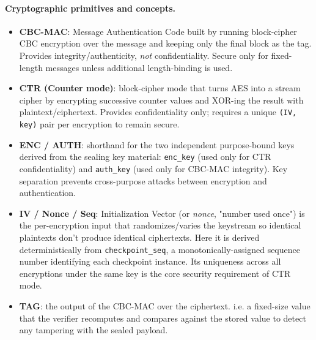 \documentclass[11pt,a4paper]{report}
\begin{document}
\paragraph{Cryptographic primitives and concepts.}
\begin{itemize}
    \item \textbf{CBC-MAC}: Message Authentication Code built by
    running block-cipher CBC encryption over the message and keeping
    only the final block as the tag. Provides integrity/authenticity,
    \textit{not} confidentiality. Secure only for fixed-length messages
    unless additional length-binding is used.

    \item \textbf{CTR (Counter mode)}: block-cipher mode that turns
    AES into a stream cipher by encrypting successive counter values
    and XOR-ing the result with plaintext/ciphertext. Provides
    confidentiality only; requires a unique \texttt{(IV, key)} pair per
    encryption to remain secure.

    \item \textbf{ENC / AUTH}: shorthand for the two independent
    purpose-bound keys derived from the sealing key material:
    \texttt{enc\_key} (used only for CTR confidentiality) and
    \texttt{auth\_key} (used only for CBC-MAC integrity). Key
    separation prevents cross-purpose attacks between encryption and
    authentication.

    \item \textbf{IV / Nonce / Seq}: Initialization Vector
    (or \textit{nonce}, "number used once") is the per-encryption input
    that randomizes/varies the keystream so identical plaintexts don't
    produce identical ciphertexts. Here it is derived deterministically
    from \texttt{checkpoint\_seq}, a monotonically-assigned sequence
    number identifying each checkpoint instance. Its uniqueness across
    all encryptions under the same key is the core security
    requirement of CTR mode.

    \item \textbf{TAG}: the output of the CBC-MAC over the ciphertext.
    i.e. a fixed-size value that the verifier recomputes and compares
    against the stored value to detect any tampering with the sealed
    payload.
\end{itemize}
\end{document}
